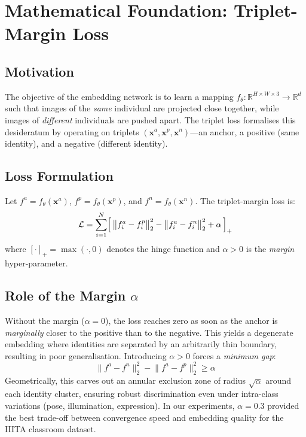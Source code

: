 \documentclass[conference, 10pt]{IEEEtran}
\begin{document}

\section{Mathematical Foundation: Triplet-Margin Loss}
\label{sec:math}

\subsection{Motivation}

The objective of the embedding network is to learn a mapping $f_\theta : \mathbb{R}^{H \times
W \times 3} \to \mathbb{R}^{d}$ such that images of the \emph{same} individual are
projected close together, while images of \emph{different} individuals are pushed apart.
The triplet loss formalises this desideratum by operating on triplets
$(\mathbf{x}^a, \mathbf{x}^p, \mathbf{x}^n)$---an anchor, a positive (same identity), and a
negative (different identity).

\subsection{Loss Formulation}

Let $f^a = f_\theta(\mathbf{x}^a)$, $f^p = f_\theta(\mathbf{x}^p)$, and
$f^n = f_\theta(\mathbf{x}^n)$.  The triplet-margin loss is:
\begin{equation}
\label{eq:triplet}
    \mathcal{L} = \sum_{i=1}^{N}
    \Bigl[\,
        \bigl\| f^a_i - f^p_i \bigr\|_2^{2}
      - \bigl\| f^a_i - f^n_i \bigr\|_2^{2}
      + \alpha
    \,\Bigr]_{+}
\end{equation}
where $[\cdot]_{+} = \max(\cdot, 0)$ denotes the hinge function and $\alpha > 0$ is the
\emph{margin} hyper-parameter.

\subsection{Role of the Margin $\alpha$}

Without the margin ($\alpha = 0$), the loss reaches zero as soon as the anchor is
\emph{marginally} closer to the positive than to the negative.  This yields a degenerate
embedding where identities are separated by an arbitrarily thin boundary, resulting in poor
generalisation.  Introducing $\alpha > 0$ forces a \emph{minimum gap}:
\begin{equation}
\label{eq:margin_cond}
    \bigl\| f^a - f^n \bigr\|_2^{2}
    - \bigl\| f^a - f^p \bigr\|_2^{2}
    \geq \alpha
\end{equation}
Geometrically, this carves out an annular exclusion zone of radius $\sqrt{\alpha}$ around
each identity cluster, ensuring robust discrimination even under intra-class variations
(pose, illumination, expression).  In our experiments, $\alpha = 0.3$ provided the best
trade-off between convergence speed and embedding quality for the IIITA classroom dataset.
\end{document}
